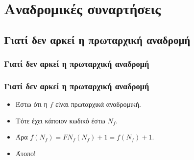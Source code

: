 \documentclass{beamer}
\begin{document}
\section{Αναδρομικές συναρτήσεις}

\subsection{Γιατί δεν αρκεί η πρωταρχική αναδρομή}

\begin{frame}
        \frametitle{Γιατί δεν αρκεί η πρωταρχική αναδρομή}
\end{frame}

\begin{frame}
        \frametitle{Γιατί δεν αρκεί η πρωταρχική αναδρομή}
        \begin{itemize}
                \item Έστω ότι η $f$ είναι πρωταρχικά αναδρομική.
                \pause
                \item Τότε έχει κάποιον κωδικό έστω $N_f$.
                \pause
                \item Άρα $f(N_f) = FN_f(N_f) + 1 = f(N_f) + 1$.
                \pause
                \item Άτοπο!
        \end{itemize}
\end{frame}
\end{document}
